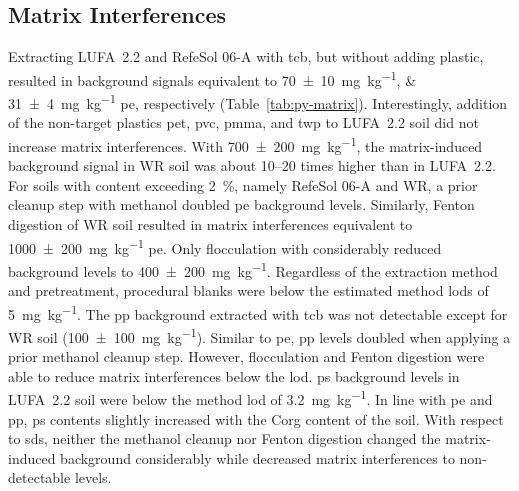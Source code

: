 \subsection{Matrix Interferences}\label{sec:matrix-interferences}

Extracting LUFA~2.2 and RefeSol 06-A with \ac{tcb}, but without adding plastic, resulted in background signals equivalent to \SIlist{70(10);31(4)}{\milli\gram\per\kilo\gram} \ac{pe}, respectively (Table~\ref{tab:py-matrix}). Interestingly, addition of the non-target plastics \ac{pet}, \ac{pvc}, \ac{pmma}, and \ac{twp} to LUFA~2.2 soil did not increase matrix interferences. With \SI{700(200)}{\milli\gram\per\kilo\gram}, the matrix-induced background signal in WR soil was about \numrange{10}{20} times higher than in LUFA~2.2. For soils with  content exceeding \SI{2}{\percent}, namely RefeSol 06-A and WR, a prior cleanup step with methanol doubled \ac{pe} background levels. Similarly, Fenton digestion of WR soil resulted in matrix interferences equivalent to \SI{1000(200)}{\milli\gram\per\kilo\gram} \ac{pe}. Only flocculation with  considerably reduced background levels to \SI{400(200)}{\milli\gram\per\kilo\gram}. Regardless of the extraction method and pretreatment, procedural blanks were below the estimated method \acp{lod} of \SI{5}{\milli\gram\per\kilo\gram}.
The \ac{pp} background extracted with \ac{tcb} was not detectable except for WR soil (\SI{100(100)}{\milli\gram\per\kilo\gram}). Similar to \ac{pe}, \ac{pp} levels doubled when applying a prior methanol cleanup step. However,  flocculation and Fenton digestion were able to reduce matrix interferences below the \ac{lod}.
\Ac{ps} background levels in LUFA~2.2 soil were below the method \ac{lod} of \SI{3.2}{\milli\gram\per\kilo\gram}. In line with \ac{pe} and \ac{pp}, \ac{ps} contents slightly increased with the \ac{Corg} content of the soil. With respect to \acp{sd}, neither the methanol cleanup nor Fenton digestion changed the matrix-induced background considerably while  decreased matrix interferences to non-detectable levels.

